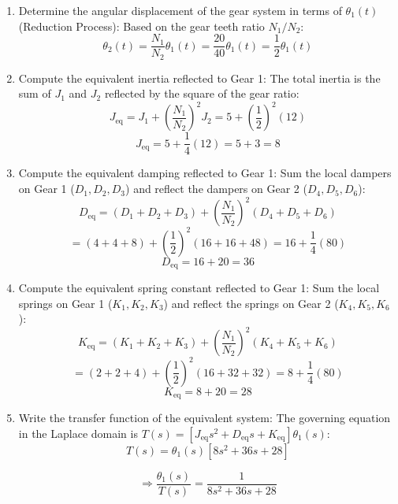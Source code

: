 \documentclass[11pt]{article}
\begin{document}
\begin{enumerate}[label=(\alph*), itemindent=*, leftmargin=*, nolistsep]
    \item Determine the angular displacement of the gear system in terms of \( \theta_1(t) \) (Reduction Process):
    Based on the gear teeth ratio $N_1/N_2$:
    \[
    \theta_2(t) = \frac{N_1}{N_2} \theta_1(t) = \frac{20}{40} \theta_1(t) = \frac{1}{2} \theta_1(t)
    \]
    
    \item Compute the equivalent inertia reflected to Gear 1:
    The total inertia is the sum of $J_1$ and $J_2$ reflected by the square of the gear ratio:
    \[
    J_{\text{eq}} = J_1 + \left(\frac{N_1}{N_2}\right)^2 J_2 = 5 + \left(\frac{1}{2}\right)^2 (12)
    \]
    \[
    J_{\text{eq}} = 5 + \frac{1}{4}(12) = 5 + 3 = \boxed{8}
    \]
    
    \item Compute the equivalent damping reflected to Gear 1:
    Sum the local dampers on Gear 1 ($D_1, D_2, D_3$) and reflect the dampers on Gear 2 ($D_4, D_5, D_6$):
    \[
    D_{\text{eq}} = (D_1 + D_2 + D_3) + \left(\frac{N_1}{N_2}\right)^2 (D_4 + D_5 + D_6)
    \]
    \[
    = (4 + 4 + 8) + \left(\frac{1}{2}\right)^2 (16 + 16 + 48) = 16 + \frac{1}{4}(80)
    \]
    \[
    D_{\text{eq}} = 16 + 20 = \boxed{36}
    \]
    
    \item Compute the equivalent spring constant reflected to Gear 1:
    Sum the local springs on Gear 1 ($K_1, K_2, K_3$) and reflect the springs on Gear 2 ($K_4, K_5, K_6$):
    \[
    K_{\text{eq}} = (K_1 + K_2 + K_3) + \left(\frac{N_1}{N_2}\right)^2 (K_4 + K_5 + K_6)
    \]
    \[
    = (2 + 2 + 4) + \left(\frac{1}{2}\right)^2 (16 + 32 + 32) = 8 + \frac{1}{4}(80)
    \]
    \[
    K_{\text{eq}} = 8 + 20 = \boxed{28}
    \]
    
    \item Write the transfer function of the equivalent system:
    The governing equation in the Laplace domain is $T(s) = [J_{\text{eq}}s^2 + D_{\text{eq}}s + K_{\text{eq}}]\theta_1(s)$:
    \[
    T(s) = \theta_1(s) \left[ 8 s^2 + 36 s + 28 \right]
    \]
    
    \[
    \Rightarrow \boxed{
    \frac{\theta_1(s)}{T(s)} = \frac{1}{8 s^2 + 36 s + 28}
    }
    \]
\end{enumerate}

\end{document}
